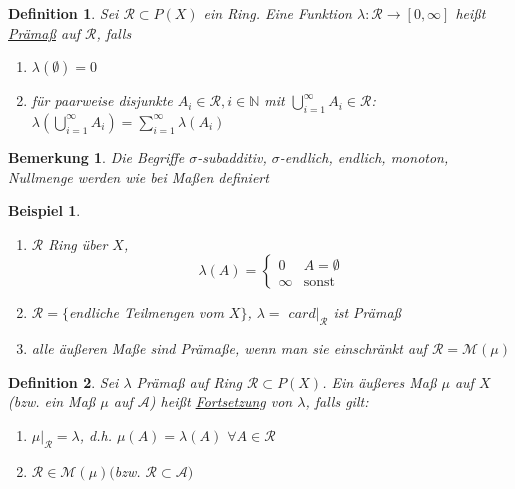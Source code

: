 \documentclass[11pt]{memoir}
\theoremstyle{break}
\newtheorem{Definition}{Definition}[chapter]
\newtheorem{Bemerkung}{Bemerkung}[chapter]
\newtheorem{Beispiel}{Beispiel}[chapter]
\begin{document}
\begin{Definition}
Sei $\mathscr R \subset P(X)$ ein Ring. Eine Funktion $\lambda: \mathscr R \rightarrow [0, \infty]$ heißt \underline{Prämaß} auf $\mathscr R$, falls
\begin{enumerate}
	\item $\lambda(\emptyset) = 0$
	\item für paarweise disjunkte $A_i \in \mathscr R, i \in \mathbb N$ mit $\bigcup\limits_{i=1}^\infty A_i \in \mathscr R$: \\
	$\lambda \left(\bigcup\limits_{i=1}^\infty A_i\right) = \sum\limits_{i=1}^\infty \lambda(A_i)$
\end{enumerate}
\end{Definition}

\begin{Bemerkung}
Die Begriffe $\sigma$-subadditiv, $\sigma$-endlich, endlich, monoton, Nullmenge werden wie bei Maßen definiert
\end{Bemerkung}

\begin{Beispiel}
\begin{enumerate}
	\item $\mathscr R$ Ring über $X$,  
	\begin{equation}
	\lambda(A) =
		\begin{cases}
			0 & A = \emptyset \\
			\infty & \text{sonst}
		\end{cases}
	\end{equation}
	\item $\mathscr R = \{$endliche Teilmengen vom $X\}$, $\lambda = $ $card|_{\mathscr R}$ ist Prämaß
	\item alle äußeren Maße sind Prämaße, wenn man sie einschränkt auf $\mathscr R = \mathscr M(\mu)$
\end{enumerate}
\end{Beispiel}

\begin{Definition}
Sei $\lambda$ Prämaß auf Ring $\mathscr R \subset P(X)$. Ein äußeres Maß $\mu$ auf $X$ (bzw. ein Maß $\mu$ auf $\mathscr A$) heißt \underline{Fortsetzung} von $\lambda$, falls gilt:
\begin{enumerate}
	\item $\mu|_\mathscr R = \lambda$, d.h. $\mu(A) = \lambda(A)$ $\forall A \in \mathscr R$
	\item $\mathscr R \in \mathscr M(\mu) ($bzw. $\mathscr R \subset \mathscr A)$
\end{enumerate}
\end{Definition}
\end{document}
